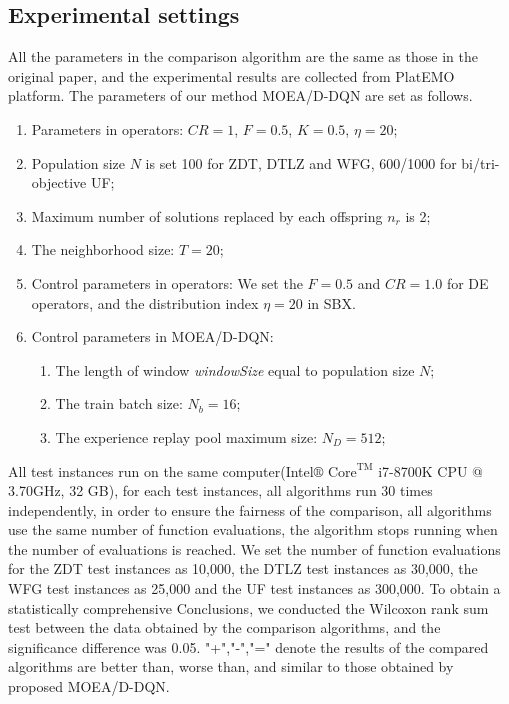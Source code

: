 \documentclass[journal]{IEEEtran}
\begin{document}
\subsection{Experimental settings}
All the parameters in the comparison algorithm are the same as those in the original paper, and the experimental results are collected from PlatEMO \cite{PlatEMO} platform.
The parameters of our method MOEA/D-DQN are set as follows.
\begin{enumerate}
  \item Parameters in operators: $CR=1$, $F=0.5$, $K=0.5$, $\eta=20$;
  \item Population size $N$ is set 100 for ZDT, DTLZ and WFG, 600/1000 for bi/tri-objective UF;
  \item Maximum number of solutions replaced by each offspring $n_r$ is 2;
  \item The neighborhood size: $T=20$;
  \item Control parameters in operators: We set the $F=0.5$ and $CR=1.0$ for DE operators, and the distribution index $\eta=20$ in SBX.
  \item Control parameters in MOEA/D-DQN:
        \begin{enumerate}
          \item The length of window \textit{windowSize} equal to population size $N$;
          \item The train batch size: $N_b = 16$;
          \item The experience replay pool maximum size: $N_D=512$;
        \end{enumerate}
\end{enumerate}

All test instances run on the same computer(Intel$\circledR$ $\text{Core}^{\text{TM}}$ i7-8700K CPU @ 3.70GHz, 32 GB), for each test instances, all algorithms run 30 times independently, in order to ensure the fairness of the comparison, all algorithms use the same number of function evaluations,
the algorithm stops running when the number of evaluations is reached.
We set the number of function evaluations for the ZDT test instances as 10,000, the DTLZ test instances as 30,000, the WFG test instances as 25,000 and the UF test instances as 300,000.
To obtain a statistically comprehensive Conclusions, we conducted the Wilcoxon rank sum test between the data obtained by the comparison algorithms, and the significance difference was 0.05.
"+","-","=" denote the results of the compared algorithms are better than, worse than, and similar to those obtained by proposed MOEA/D-DQN.
\end{document}
